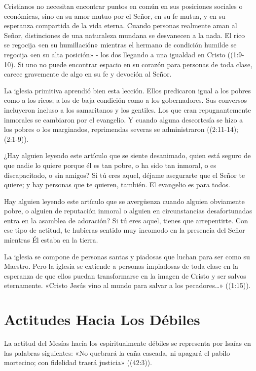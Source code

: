 \documentclass[12pt, twoside, openright]{book}
\begin{document}
Cristianos no necesitan encontrar puntos en común en sus posiciones sociales o económicas, sino en su amor mutuo por el Señor, en su fe mutua, y en su esperanza compartida de la vida eterna. Cuando personas realmente aman al Señor, distinciones de una naturaleza mundana se desvanecen a la nada. El rico se regocija «en su humillación» mientras el hermano de condición humilde se regocija «en su alta posición» - los dos llegando a una igualdad en Cristo ((1:9-10). Si uno no puede encontrar espacio en su corazón para personas de toda clase, carece gravemente de algo en su fe y devoción al Señor. 

La iglesia primitiva aprendió bien esta lección. Ellos predicaron igual a los pobres como a los ricos; a los de baja condición como a los gobernadores. Sus conversos incluyeron incluso a los samaritanos y los gentiles. Los que eran repugnantemente inmorales se cambiaron por el evangelio. Y cuando alguna descortesía se hizo a los pobres o los marginados, reprimendas severas se administraron ((2:11-14); (2:1-9)). 

¿Hay alguien leyendo este artículo que se siente desanimado, quien está seguro de que nadie lo quiere porque él es tan pobre, o ha sido tan inmoral, o es discapacitado, o sin amigos? Si tú eres aquel, déjame asegurarte que el Señor te quiere; y hay personas que te quieren, también. El evangelio es para todos.

Hay alguien leyendo este artículo que se avergüenza cuando alguien obviamente pobre, o alguien de reputación inmoral o alguien en circunstancias desafortunadas entra en la asamblea de adoración? Si tú eres aquel, tienes que arrepentirte. Con ese tipo de actitud, te hubieras sentido muy incomodo en la presencia del Señor mientras Él estaba en la tierra.

La iglesia se compone de personas santas y piadosas que luchan para ser como su Maestro. Pero la iglesia se extiende a personas impiadosas de toda clase en la esperanza de que ellos puedan transformarse en la imagen de Cristo y ser salvos eternamente. «Cristo Jesús vino al mundo para salvar a los pecadores…» ((1:15)).

\section{Actitudes Hacia Los Débiles}
La actitud del Mesías hacia los espiritualmente débiles se representa por Isaías en las palabras siguientes: «No quebrará la caña cascada, ni apagará el pabilo mortecino; con fidelidad traerá justicia» ((42:3)). 
\end{document}
